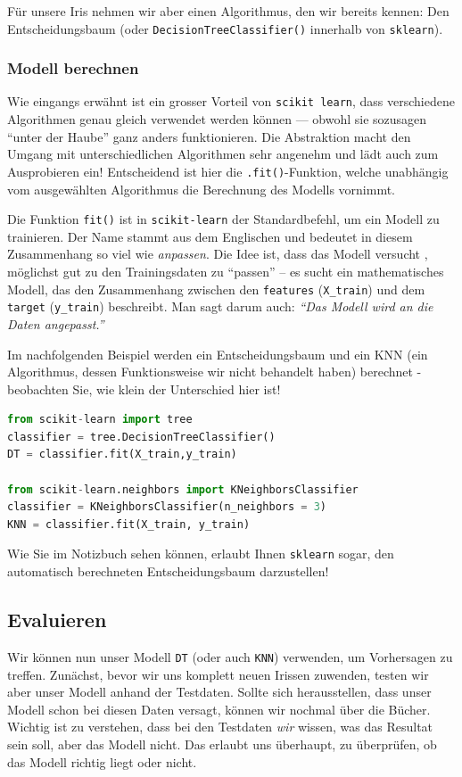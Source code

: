 \begin{lpu}
Für unsere Iris nehmen wir aber einen Algorithmus, den wir bereits kennen: Den Entscheidungsbaum (oder \texttt{DecisionTreeClassifier()} innerhalb von \texttt{sklearn}).


\subsubsection*{Modell berechnen}


Wie eingangs erwähnt ist ein grosser Vorteil von \texttt{scikit learn}, dass verschiedene Algorithmen genau gleich verwendet werden können — obwohl sie sozusagen ``unter der Haube'' ganz anders funktionieren. Die Abstraktion macht den Umgang mit unterschiedlichen Algorithmen sehr angenehm und lädt auch zum Ausprobieren ein! Entscheidend ist hier die \texttt{.fit()}-Funktion, welche unabhängig vom ausgewählten Algorithmus die Berechnung des Modells vornimmt.

Die Funktion \texttt{fit()} ist in \texttt{scikit-learn} der Standardbefehl, um ein Modell zu trainieren. Der Name stammt aus dem Englischen und bedeutet in diesem Zusammenhang so viel wie \textit{anpassen}. Die Idee ist, dass das Modell versucht , möglichst gut zu den Trainingsdaten zu ``passen'' – es sucht ein mathematisches Modell, das den Zusammenhang zwischen den \texttt{features} (\texttt{X\_train}) und dem \texttt{target} (\texttt{y\_train}) beschreibt. Man sagt darum auch: \textit{``Das Modell wird an die Daten angepasst.''}

Im nachfolgenden Beispiel werden ein Entscheidungsbaum und ein KNN (ein Algorithmus, dessen Funktionsweise wir nicht behandelt haben) berechnet - beobachten Sie, wie klein der Unterschied hier ist!

\begin{lstlisting}[language=Python]
from scikit-learn import tree
classifier = tree.DecisionTreeClassifier() 
DT = classifier.fit(X_train,y_train)

from scikit-learn.neighbors import KNeighborsClassifier
classifier = KNeighborsClassifier(n_neighbors = 3) 
KNN = classifier.fit(X_train, y_train)
\end{lstlisting}

Wie Sie im Notizbuch sehen können, erlaubt Ihnen \texttt{sklearn} sogar, den automatisch berechneten Entscheidungsbaum darzustellen!

\subsection*{Evaluieren}
Wir können nun unser Modell \texttt{DT} (oder auch \texttt{KNN}) verwenden, um Vorhersagen zu treffen. Zunächst, bevor wir uns komplett neuen Irissen zuwenden, testen wir aber unser Modell anhand der Testdaten. Sollte sich herausstellen, dass unser Modell schon bei diesen Daten versagt, können wir nochmal über die Bücher. Wichtig ist zu verstehen, dass bei den Testdaten \textit{wir} wissen, was das Resultat sein soll, aber das Modell nicht. Das erlaubt uns überhaupt, zu überprüfen, ob das Modell richtig liegt oder nicht.


\end{lpu}
